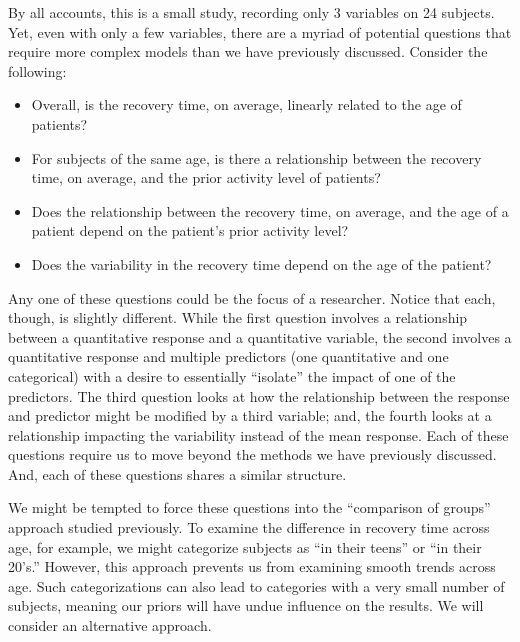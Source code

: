 \documentclass[
  letterpaper,
  DIV=11,
  numbers=noendperiod]{scrreprt}
\providecommand{\tightlist}{%
  \setlength{\itemsep}{0pt}\setlength{\parskip}{0pt}}\usepackage{longtable,booktabs,array}
\theoremstyle{definition}
\theoremstyle{definition}
\theoremstyle{plain}
\theoremstyle{remark}
\begin{document}
By all accounts, this is a small study, recording only 3 variables on 24
subjects. Yet, even with only a few variables, there are a myriad of
potential questions that require more complex models than we have
previously discussed. Consider the following:

\begin{itemize}
\tightlist
\item
  Overall, is the recovery time, on average, linearly related to the age
  of patients?
\item
  For subjects of the same age, is there a relationship between the
  recovery time, on average, and the prior activity level of patients?
\item
  Does the relationship between the recovery time, on average, and the
  age of a patient depend on the patient's prior activity level?
\item
  Does the variability in the recovery time depend on the age of the
  patient?
\end{itemize}

Any one of these questions could be the focus of a researcher. Notice
that each, though, is slightly different. While the first question
involves a relationship between a quantitative response and a
quantitative variable, the second involves a quantitative response and
multiple predictors (one quantitative and one categorical) with a desire
to essentially ``isolate'' the impact of one of the predictors. The
third question looks at how the relationship between the response and
predictor might be modified by a third variable; and, the fourth looks
at a relationship impacting the variability instead of the mean
response. Each of these questions require us to move beyond the methods
we have previously discussed. And, each of these questions shares a
similar structure.

We might be tempted to force these questions into the ``comparison of
groups'' approach studied previously. To examine the difference in
recovery time across age, for example, we might categorize subjects as
``in their teens'' or ``in their 20's.'' However, this approach prevents
us from examining smooth trends across age. Such categorizations can
also lead to categories with a very small number of subjects, meaning
our priors will have undue influence on the results. We will consider an
alternative approach.
\end{document}
